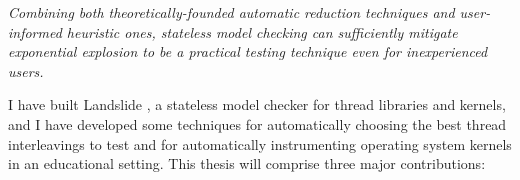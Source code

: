 \vspace{1em}

\begin{center}
	{\em Combining both theoretically-founded automatic reduction techniques
	and user-informed heuristic ones,
	stateless model checking can sufficiently mitigate exponential explosion
	to be a practical testing technique even for inexperienced users.}
\end{center}

\vspace{1em}

I have built Landslide \cite{landslide}, a stateless model checker for thread libraries and kernels,
and I have developed some techniques for automatically choosing the best thread interleavings to test
and for automatically instrumenting operating system kernels in an educational setting.
This thesis will comprise three major contributions:

